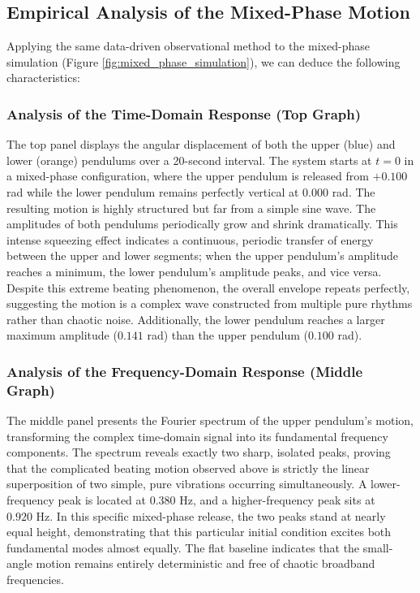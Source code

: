 \documentclass[12pt, a4paper, twoside]{article}
\begin{document}
\subsection{Empirical Analysis of the Mixed-Phase Motion}
Applying the same data-driven observational method to the mixed-phase simulation (Figure \ref{fig:mixed_phase_simulation}), we can deduce the following characteristics:

\subsubsection{Analysis of the Time-Domain Response (Top Graph)}
The top panel displays the angular displacement of both the upper (blue) and lower (orange) pendulums over a 20-second interval. The system starts at $t=0$ in a mixed-phase configuration, where the upper pendulum is released from $+0.100$ rad while the lower pendulum remains perfectly vertical at $0.000$ rad. The resulting motion is highly structured but far from a simple sine wave. The amplitudes of both pendulums periodically grow and shrink dramatically. This intense squeezing effect indicates a continuous, periodic transfer of energy between the upper and lower segments; when the upper pendulum's amplitude reaches a minimum, the lower pendulum's amplitude peaks, and vice versa. Despite this extreme beating phenomenon, the overall envelope repeats perfectly, suggesting the motion is a complex wave constructed from multiple pure rhythms rather than chaotic noise. Additionally, the lower pendulum reaches a larger maximum amplitude ($0.141$ rad) than the upper pendulum ($0.100$ rad).

\subsubsection{Analysis of the Frequency-Domain Response (Middle Graph)}
The middle panel presents the Fourier spectrum of the upper pendulum's motion, transforming the complex time-domain signal into its fundamental frequency components. The spectrum reveals exactly two sharp, isolated peaks, proving that the complicated beating motion observed above is strictly the linear superposition of two simple, pure vibrations occurring simultaneously. A lower-frequency peak is located at $0.380 \text{ Hz}$, and a higher-frequency peak sits at $0.920 \text{ Hz}$. In this specific mixed-phase release, the two peaks stand at nearly equal height, demonstrating that this particular initial condition excites both fundamental modes almost equally. The flat baseline indicates that the small-angle motion remains entirely deterministic and free of chaotic broadband frequencies.
\end{document}
